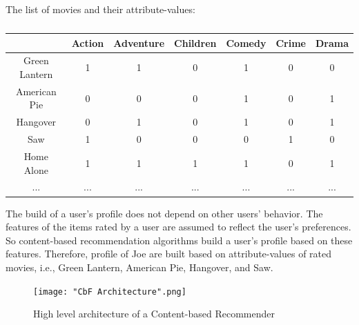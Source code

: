 \documentclass[oneside,13pt]{extreport}
\begin{document}
The list of movies and their attribute-values:
\begin{table}[h!]
    \small\centering
    \begin{tabular}{|c|c|c|c|c|c|c|}
        \hline
         & Action & Adventure & Children & Comedy & Crime & Drama   \\
        \hline
        Green Lantern & 1 & 1 & 0 & 1 & 0 & 0 \\
        \hline
        American Pie & 0 & 0 & 0 & 1 & 0 & 1 \\
        \hline
        Hangover & 0 & 1 & 0 & 1 & 0 & 1 \\
        \hline
        Saw & 1 & 0 & 0 & 0 & 1 & 0 \\
        \hline
        Home Alone & 1 & 1 & 1 & 1 & 0 & 1 \\
        \hline
        ... & ... & ... & ... & ... & ... & ... \\
        \hline
    \end{tabular}
    \caption*{}
\end{table}

The build of a user’s profile does not depend on other users’ behavior. The features of the items rated by a user are assumed to reflect the user's preferences. So content-based recommendation algorithms build a user's profile based on these features. Therefore, profile of Joe are built based on attribute-values of rated movies, i.e., Green Lantern, American Pie, Hangover, and Saw.

\begin{figure}[h!]
    \centering
    \texttt{[image: "CbF Architecture".png]} 
    \caption{High level architecture of a Content-based Recommender~\cite{Lops11}}
    \!\!\!\!
    \label{fig:CbF Architecture}
\end{figure}
\end{document}
